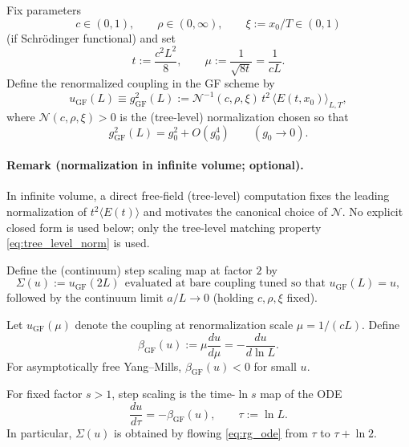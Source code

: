 Fix parameters
\begin{equation}
 c\in(0,1),\qquad \rho\in(0,\infty),\qquad \xi:=x_0/T\in(0,1)
\end{equation}
(if Schr\"odinger functional) and set
\begin{equation}
\label{eq:t_def}
 t:=\frac{c^2L^2}{8},\qquad \mu:=\frac{1}{\sqrt{8t}}=\frac{1}{cL}.
\end{equation}
Define the renormalized coupling in the GF scheme by
\begin{equation}
\label{eq:gf_coupling_def}
 u_{\mathrm{GF}}(L)\equiv g^2_{\mathrm{GF}}(L):=\mathcal N^{-1}(c,\rho,\xi)\,t^2\,\langle E(t,x_0)\rangle_{L,T},
\end{equation}
where $\mathcal N(c,\rho,\xi)>0$ is the (tree-level) normalization chosen so that
\begin{equation}
\label{eq:tree_level_norm}
 g^2_{\mathrm{GF}}(L)=g_0^2+O(g_0^4)\qquad (g_0\to 0).
\end{equation}


\paragraph{Remark (normalization in infinite volume; optional).}
In infinite volume, a direct free-field (tree-level) computation fixes the leading normalization of
$t^2\langle E(t)\rangle$ and motivates the canonical choice of $\mathcal N$.
No explicit closed form is used below; only the tree-level matching property \eqref{eq:tree_level_norm} is used.

Define the (continuum) step scaling map at factor $2$ by
\begin{equation}
\label{eq:step_scaling_def}
\Sigma(u):=u_{\mathrm{GF}}(2L)\ \ \text{evaluated at bare coupling tuned so that }u_{\mathrm{GF}}(L)=u,
\end{equation}
followed by the continuum limit $a/L\to 0$ (holding $c,\rho,\xi$ fixed).

Let $u_{\mathrm{GF}}(\mu)$ denote the coupling at renormalization scale $\mu=1/(cL)$.
Define
\begin{equation}
\label{eq:beta_def}
\beta_{\mathrm{GF}}(u):=\mu\frac{du}{d\mu}=-\frac{d u}{d\ln L}.
\end{equation}
For asymptotically free Yang--Mills, $\beta_{\mathrm{GF}}(u)<0$ for small $u$.

For fixed factor $s>1$, step scaling is the time-$\ln s$ map of the ODE
\begin{equation}
\label{eq:rg_ode}
\frac{d u}{d\tau} = -\beta_{\mathrm{GF}}(u),\qquad \tau:=\ln L.
\end{equation}
In particular, $\Sigma(u)$ is obtained by flowing \eqref{eq:rg_ode} from $\tau$ to $\tau+\ln 2$.

